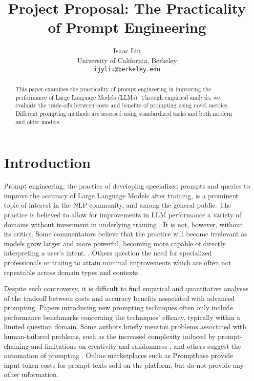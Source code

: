 \documentclass[11pt]{article}
\title{Project Proposal: The Practicality of Prompt Engineering}
\author{Isaac Liu \\
  University of California, Berkeley \\
  \texttt{ijyliu@berkeley.edu}}
\begin{document}
\maketitle
\begin{abstract}
This paper examines the practicality of prompt engineering in improving the performance of Large Language Models (LLMs). Through empirical analysis, we evaluate the trade-offs between costs and benefits of prompting using novel metrics. Different prompting methods are assessed using standardized tasks and both modern and older models.
\end{abstract}

\section*{Introduction}

Prompt engineering, the practice of developing specialized prompts and queries to improve the accuracy of Large Language Models after training, is a prominent topic of interest in the NLP community, and among the general public. The practice is believed to allow for improvements in LLM performance a variety of domains without investment in underlying training \cite{martineau_what_2021}. It is not, however, without its critics. Some commentators believe that the practice will become irrelevant as models grow larger and more powerful, becoming more capable of directly interpreting a user's intent. \cite{ethan_mollick_emollick_i_2023}. Others question the need for specialized professionals or traiing to attain minimal improvements which are often not repeatable across domain types and contexts \cite{shackell_prompt_2023, acar_ai_2023}. 

Despite such controversy, it is difficult to find empirical and quantitative analyses of the tradeoff between costs and accuracy benefits associated with advanced prompting. Papers introducing new prompting techniques often only include performance benchmarks concerning the techniques' efficacy, typically within a limited question domain. Some authors briefly mention problems associated with human-tailored problems, such as the increased complexity induced by prompt-chaining and limitations on creativity and randomness \cite{wu_ai_2022}, and others suggest the automation of prompting \cite{diao_active_2023}. Online marketplaces such as Promptbase \cite{noauthor_promptbase_nodate} provide input token costs for prompt texts sold on the platform, but do not provide any other information.
\end{document}
